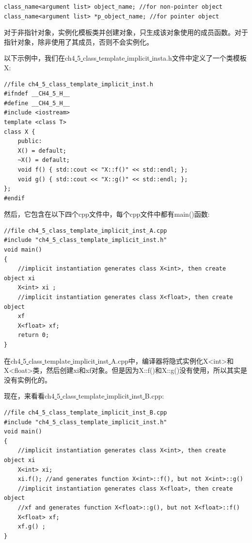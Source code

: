 \begin{lstlisting}[caption={}]
class_name<argument list> object_name; //for non-pointer object
class_name<argument list> *p_object_name; //for pointer object
\end{lstlisting}

对于非指针对象，实例化模板类并创建对象，只生成该对象使用的成员函数。对于指针对象，除非使用了其成员，否则不会实例化。 \par
以下示例中，我们在ch4\underline{ }5\underline{ }class\underline{ }template\underline{ }implicit\underline{ }insta.h文件中定义了一个类模板X:\par

\begin{lstlisting}[caption={}]
//file ch4_5_class_template_implicit_inst.h
#ifndef __CH4_5_H__
#define __CH4_5_H__
#include <iostream>
template <class T>
class X {
	public:
	X() = default;
	~X() = default;
	void f() { std::cout << "X::f()" << std::endl; };
	void g() { std::cout << "X::g()" << std::endl; };
};
#endif
\end{lstlisting}

然后，它包含在以下四个cpp文件中，每个cpp文件中都有main()函数: \par

\begin{lstlisting}[caption={}]
//file ch4_5_class_template_implicit_inst_A.cpp
#include "ch4_5_class_template_implicit_inst.h"
void main()
{
	//implicit instantiation generates class X<int>, then create object xi
	X<int> xi ;
	//implicit instantiation generates class X<float>, then create object
	xf
	X<float> xf;
	return 0;
}
\end{lstlisting}

在ch4\underline{ }5\underline{ }class\underline{ }template\underline{ }implicit\underline{ }inst\underline{ }A.cpp中，编译器将隐式实例化X<int>和X<float>类，然后创建xi和xf对象。但是因为X::f()和X::g()没有使用，所以其实是没有实例化的。 \par
现在，来看看ch4\underline{ }5\underline{ }class\underline{ }template\underline{ }implicit\underline{ }inst\underline{ }B.cpp: \par

\begin{lstlisting}[caption={}]
//file ch4_5_class_template_implicit_inst_B.cpp
#include "ch4_5_class_template_implicit_inst.h"
void main()
{
	//implicit instantiation generates class X<int>, then create object xi
	X<int> xi;
	xi.f(); //and generates function X<int>::f(), but not X<int>::g()
	//implicit instantiation generates class X<float>, then create object
	//xf and generates function X<float>::g(), but not X<float>::f()
	X<float> xf;
	xf.g() ;
}
\end{lstlisting}


